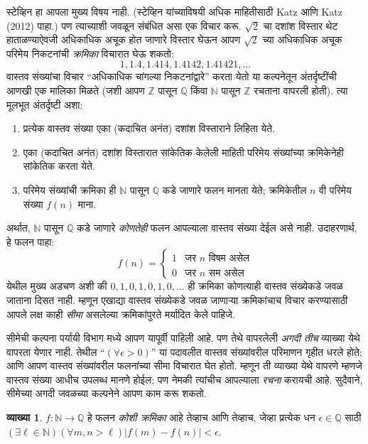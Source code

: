 \documentclass[11pt,a4paper,openany]{book}
\theoremstyle{definition}
\newtheorem{defn}{व्याख्या}[section]
\newcommand{\Nat}{\mathbb{N}}
\newcommand{\Int}{\mathbb{Z}}
\newcommand{\Rat}{\mathbb{Q}}
\begin{document}
स्टेव्हिन हा आपला मुख्य विषय नाही. (स्टेव्हिन यांच्याविषयी अधिक माहितीसाठी
Katz आणि Katz (2012) पाहा.) पण त्याच्याशी जवळून संबंधित असा एक विचार
करू. $\sqrt{2}$ चा दशांश विस्तार थेट हाताळण्याऐवजी अधिकाधिक अचूक होत
जाणारे विस्तार घेऊन आपण $\sqrt{2}$ च्या अधिकाधिक अचूक परिमेय निकटनांची
\emph{क्रमिका} विचारात घेऊ शकतो:
\[
1, 1.4, 1.414, 1.4142, 1.41421,\ldots
\]
वास्तव संख्यांचा विचार “अधिकाधिक चांगल्या निकटनांद्वारे” करता येतो या
कल्पनेतून अंतर्दृष्टींची आणखी एक मालिका मिळते (जशी आपण $\Int$ पासून
$\Rat$ किंवा $\Nat$ पासून $\Int$ रचताना वापरली होती). त्या मूलभूत
अंतर्दृष्टी अशा:
\begin{enumerate}
	\item प्रत्येक वास्तव संख्या एका (कदाचित अनंत) दशांश विस्ताराने
	लिहिता येते.
	\item एका (कदाचित अनंत) दशांश विस्तारात सांकेतिक केलेली माहिती
	परिमेय संख्यांच्या क्रमिकेनेही सांकेतिक करता येते.
	\item परिमेय संख्यांची क्रमिका ही $\Nat$ पासून $\Rat$ कडे जाणारे
	फलन मानता येते; क्रमिकेतील $n$ वी परिमेय संख्या $f(n)$ माना.
\end{enumerate}
अर्थात, $\Nat$ पासून $\Rat$ कडे जाणारे \emph{कोणतेही} फलन आपल्याला वास्तव
संख्या देईल असे नाही. उदाहरणार्थ, हे फलन पाहा:
\[
	f(n) =\begin{cases}
			1 & \text{जर }n\text{ विषम असेल}\\
			0 &\text{जर }n\text{ सम असेल}
		\end{cases}
\]
येथील मुख्य अडचण अशी की $0,1,0,1,0,1,0,\ldots$ ही क्रमिका कोणत्याही
वास्तव संख्येकडे जवळ जाताना दिसत नाही. म्हणून एखाद्या वास्तव संख्येकडे
जवळ जाणाऱ्या क्रमिकांचाच विचार करण्यासाठी आपले लक्ष काही \emph{सीमा}
असलेल्या क्रमिकांपुरते मर्यादित केले पाहिजे.

सीमेची कल्पना पर्यायी विभाग मध्ये आपण यापूर्वी पाहिली
आहे. पण तेथे वापरलेली \emph{अगदी तीच} व्याख्या येथे वापरता येणार नाही.
तेथील “$(\forall \epsilon>0)$” या पदावलीत वास्तव संख्यांवरील
परिमाणन गृहीत धरले होते; आणि आपण वास्तव संख्यांवरील फलनांच्या सीमा
विचारात घेत होतो. म्हणून ती व्याख्या येथे वापरणे म्हणजे वास्तव संख्या
आधीच उपलब्ध मानणे होईल; पण नेमकी त्यांचीच आपल्याला \emph{रचना} करायची
आहे. सुदैवाने, सीमेच्या अगदी जवळच्या कल्पनेने आपण काम करू शकतो.
\begin{defn}\label{sfr:arith:cauchy:def:CauchySequence}
  $f: \Nat \to \Rat$ हे फलन \emph{कोशी क्रमिका} आहे तेव्हाच आणि
  तेव्हाच, जेव्हा प्रत्येक धन $\epsilon \in \Rat$ साठी $(\exists \ell
  \in \Nat)(\forall m, n > \ell)|f(m) - f(n)| < \epsilon$.
\end{defn}
\end{document}
